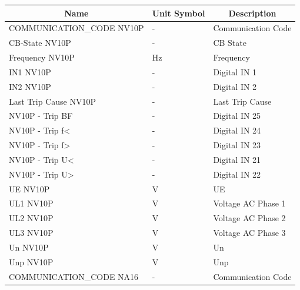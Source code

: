 
\begin{table}[H]
	\begin{center}
		\begin{tabular}[c]{l|l|l}
			\hline
			\multicolumn{1}{c|}{\textbf{Name}}        &
			\multicolumn{1}{c|}{\textbf{Unit Symbol}} &
			\multicolumn{1}{c}{\textbf{Description}}                            \\
			\hline
			COMMUNICATION\_CODE NV10P                 & -  & Communication Code \\
			CB-State NV10P                            & -  & CB State           \\
			Frequency NV10P                           & Hz & Frequency          \\
			IN1 NV10P                                 & -  & Digital IN 1       \\
			IN2 NV10P                                 & -  & Digital IN 2       \\
			Last Trip Cause NV10P                     & -  & Last Trip Cause    \\
			NV10P - Trip BF                           & -  & Digital IN 25      \\
			NV10P - Trip f<                           & -  & Digital IN 24      \\
			NV10P - Trip f>                           & -  & Digital IN 23      \\
			NV10P - Trip U<                           & -  & Digital IN 21      \\
			NV10P - Trip U>                           & -  & Digital IN 22      \\
			UE NV10P                                  & V  & UE                 \\
			UL1 NV10P                                 & V  & Voltage AC Phase 1 \\
			UL2 NV10P                                 & V  & Voltage AC Phase 2 \\
			UL3 NV10P                                 & V  & Voltage AC Phase 3 \\
			Un NV10P                                  & V  & Un                 \\
			Unp NV10P                                 & V  & Unp                \\
			COMMUNICATION\_CODE NA16                  & -  & Communication Code \\

\end{tabular}
\end{center}
\end{table}

